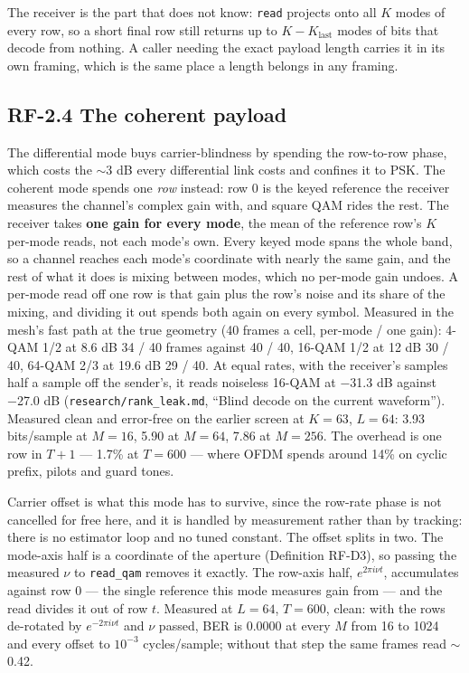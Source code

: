 \documentclass[10pt,letterpaper,twocolumn]{article}
\begin{document}
The receiver is the part that does not know: \texttt{read} projects onto all \(K\) modes of every row, so a short final row still returns up to \(K - K_{\text{last}}\) modes of bits that decode from nothing. A caller needing the exact payload length carries it in its own framing, which is the same place a length belongs in any framing.

\subsection{RF-2.4 The coherent payload}\label{rf-24-the-coherent-payload}

The differential mode buys carrier-blindness by spending the row-to-row phase, which costs the \(\sim\)3 dB every differential link costs and confines it to PSK. The coherent mode spends one \emph{row} instead: row 0 is the keyed reference the receiver measures the channel's complex gain with, and square QAM rides the rest. The receiver takes \textbf{one gain for every mode}, the mean of the reference row's \(K\) per-mode reads, not each mode's own. Every keyed mode spans the whole band, so a channel reaches each mode's coordinate with nearly the same gain, and the rest of what it does is mixing between modes, which no per-mode gain undoes. A per-mode read off one row is that gain plus the row's noise and its share of the mixing, and dividing it out spends both again on every symbol. Measured in the mesh's fast path at the true geometry (40 frames a cell, per-mode / one gain): 4-QAM 1/2 at 8.6 dB 34 / 40 frames against 40 / 40, 16-QAM 1/2 at 12 dB 30 / 40, 64-QAM 2/3 at 19.6 dB 29 / 40. At equal rates, with the receiver's samples half a sample off the sender's, it reads noiseless 16-QAM at −31.3 dB against −27.0 dB (\texttt{research/\allowbreak{}rank\_\allowbreak{}leak.\allowbreak{}md}, ``Blind decode on the current waveform''). Measured clean and error-free on the earlier screen at \(K=63\), \(L=64\): 3.93 bits/sample at \(M{=}16\), 5.90 at \(M{=}64\), 7.86 at \(M{=}256\). The overhead is one row in \(T{+}1\) --- 1.7\% at \(T=600\) --- where OFDM spends around 14\% on cyclic prefix, pilots and guard tones.

Carrier offset is what this mode has to survive, since the row-rate phase is not cancelled for free here, and it is handled by measurement rather than by tracking: there is no estimator loop and no tuned constant. The offset splits in two. The mode-axis half is a coordinate of the aperture (Definition RF-D3), so passing the measured \(\nu\) to \texttt{read\_\allowbreak{}qam} removes it exactly. The row-axis half, \(e^{2\pi i \nu t}\), accumulates against row 0 --- the single reference this mode measures gain from --- and the read divides it out of row \(t\). Measured at \(L=64\), \(T=600\), clean: with the rows de-rotated by \(e^{-2\pi i \nu t}\) and \(\nu\) passed, BER is 0.0000 at every \(M\) from 16 to 1024 and every offset to \(10^{-3}\) cycles/sample; without that step the same frames read \(\sim\)0.42.
\end{document}

